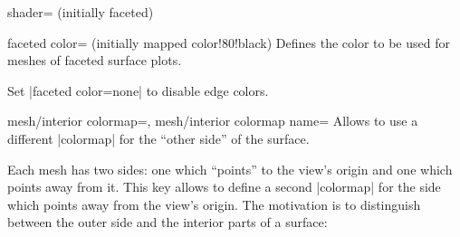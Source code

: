 {\begin{pgfplotskey}{shader= (initially faceted)}
\pgfplotsexpensiveexample
\begin{codeexample}[]
\end{codeexample}

\pgfplotsexpensiveexample
\begin{codeexample}[]
\end{codeexample}
\end{pgfplotskey}

\begin{pgfplotskey}{faceted color= (initially mapped color!80!black)}
	Defines the color to be used for meshes of faceted surface plots.

	Set |faceted color=none| to disable edge colors.
\end{pgfplotskey}

{
%
%
\begin{pgfplotskeylist}{%
	mesh/interior colormap=,%
	mesh/interior colormap name=}
	Allows to use a different |colormap| for the ``other side'' of the surface.

	Each mesh has two sides: one which ``points'' to the view's origin and one which points away from it. This key allows to define a second |colormap| for the side which points away from the view's origin. The motivation is to distinguish between the outer side and the interior parts of a surface:
\pgfplotsexpensiveexample
\begin{codeexample}[]
\end{codeexample}


\end{pgfplotskeylist}}}
